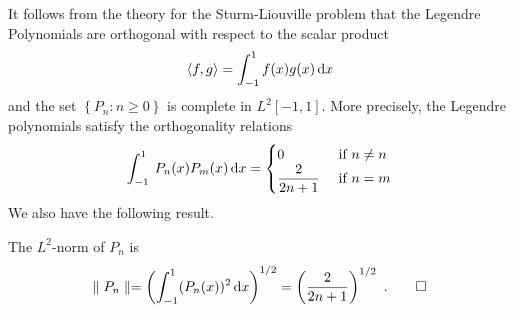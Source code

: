 It follows from the theory for the Sturm-Liouville problem that the
Legendre Polynomials are orthogonal with respect to the scalar product
\[
\left\langle{f} , {g}\right\rangle = \int_{-1}^1 f(x)g(x) \,\mathrm{d}{x}
\]
and the set $\left\{ P_n : n \geq 0\right\}$ is complete in
$\displaystyle L^2[-1,1]$.  More precisely, the Legendre polynomials
satisfy the orthogonality relations
\[
\int_{-1}^{1} \: P_n(x) P_m(x) \,\mathrm{d}{x} =
\begin{cases}
0 & \mbox{ if } n \neq n \\
\displaystyle \frac{2}{2n+1} & \mbox{ if } n = m
\end{cases}
\]
We also have the following result.

\begin{prop}
The $\displaystyle L^2$-norm of $P_n$ is
\[
\parallel P_n \parallel = \left( \int_{-1}^{1} (P_n(x))^2 \dx{x}
\right)^{1/2} = \left( \frac{2}{2n+1} \right)^{1/2} \ .  \qedhere
\]
\end{prop}

